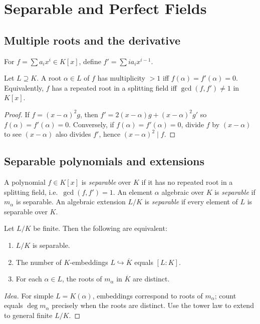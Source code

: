 \section{Separable and Perfect Fields}

\subsection{Multiple roots and the derivative}
For $f=\sum a_ix^i\in K[x]$, define $f'=\sum ia_ix^{i-1}$. 

\begin{proposition}\label{prop:gcd}
Let $L\supseteq K$. A root $\alpha\in L$ of $f$ has multiplicity $>1$ iff $f(\alpha)=f'(\alpha)=0$. Equivalently, $f$ has a repeated root in a splitting field iff $\gcd(f,f')\neq 1$ in $K[x]$.
\end{proposition}
\begin{proof}
If $f=(x-\alpha)^2g$, then $f'=2(x-\alpha)g+(x-\alpha)^2g'$ so $f(\alpha)=f'(\alpha)=0$.  
Conversely, if $f(\alpha)=f'(\alpha)=0$, divide $f$ by $(x-\alpha)$ to see $(x-\alpha)$ also divides $f'$, hence $(x-\alpha)^2\mid f$.
\end{proof}

\subsection{Separable polynomials and extensions}
\begin{definition}
A polynomial $f\in K[x]$ is \emph{separable} over $K$ if it has no repeated root in a splitting field, i.e.\ $\gcd(f,f')=1$.  
An element $\alpha$ algebraic over $K$ is \emph{separable} if $m_\alpha$ is separable.  
An algebraic extension $L/K$ is \emph{separable} if every element of $L$ is separable over $K$.
\end{definition}

\begin{theorem}\label{thm:sep-emb}
Let $L/K$ be finite. Then the following are equivalent:
\begin{enumerate}
\item $L/K$ is separable.
\item The number of $K$-embeddings $L\hookrightarrow \overline{K}$ equals $[L:K]$.
\item For each $\alpha\in L$, the roots of $m_\alpha$ in $\overline{K}$ are distinct.
\end{enumerate}
\end{theorem}
\begin{proof}[Idea]
For simple $L=K(\alpha)$, embeddings correspond to roots of $m_\alpha$; count equals $\deg m_\alpha$ precisely when the roots are distinct. Use the tower law to extend to general finite $L/K$.
\end{proof}

